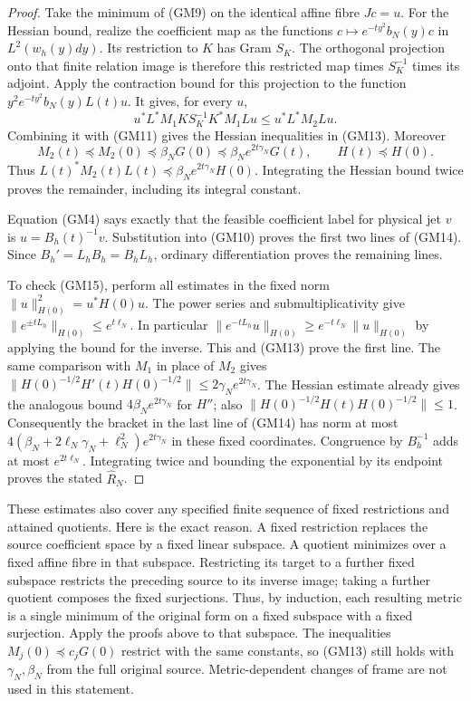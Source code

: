 \documentclass[11pt]{article}
\theoremstyle{remark}\newtheorem{remark}[theorem]{Remark}
\begin{document}
\begin{proof}
Take the minimum of (GM9) on the identical affine fibre $Jc=u$.
For the Hessian bound, realize the coefficient map as the functions
$c\mapsto e^{-ty^2}b_N(y)c$ in $L^2(w_h(y)dy)$.  Its restriction to
$K$ has Gram $S_K$.  The orthogonal projection onto that finite
relation image is therefore this restricted map times $S_K^{-1}$
times its adjoint.  Apply the contraction bound for this projection
to the function $y^2e^{-ty^2}b_N(y)L(t)u$.  It gives, for every $u$,
\[
 u^*L^*M_1K S_K^{-1}K^*M_1Lu\leq u^*L^*M_2Lu.
\]
Combining it with (GM11) gives the Hessian inequalities in (GM13).
Moreover
\[
 M_2(t)\preceq M_2(0)\preceq\beta_NG(0)
       \preceq\beta_Ne^{2t\gamma_N}G(t),
 \qquad H(t)\preceq H(0).
\]
Thus $L(t)^*M_2(t)L(t)\preceq
\beta_Ne^{2t\gamma_N}H(0)$.  Integrating the Hessian bound twice
proves the remainder, including its integral constant.

Equation (GM4) says exactly that the feasible coefficient label for
physical jet $v$ is $u=B_h(t)^{-1}v$.  Substitution into (GM10) proves
the first two lines of (GM14).  Since $B_h'=L_hB_h=B_hL_h$,
ordinary differentiation proves the remaining lines.

To check (GM15), perform all estimates in the fixed norm
$\|u\|_{H(0)}^2=u^*H(0)u$.  The power series and submultiplicativity
give $\|e^{\pm tL_h}\|_{H(0)}\leq e^{t\ell_N}$.  In particular
$\|e^{-tL_h}u\|_{H(0)}\geq e^{-t\ell_N}\|u\|_{H(0)}$ by applying
the bound for the inverse.  This and (GM13) prove the first line.
The same comparison with $M_1$ in place of $M_2$ gives
$\|H(0)^{-1/2}H'(t)H(0)^{-1/2}\|
\leq2\gamma_Ne^{2t\gamma_N}$.  The Hessian estimate already gives
the analogous bound $4\beta_Ne^{2t\gamma_N}$ for $H''$; also
$\|H(0)^{-1/2}H(t)H(0)^{-1/2}\|\leq1$.
Consequently the bracket in the last line of (GM14) has norm at most
$4(\beta_N+2\ell_N\gamma_N+\ell_N^2)e^{2t\gamma_N}$ in these fixed
coordinates.  Congruence by $B_h^{-1}$ adds at most $e^{2t\ell_N}$.
Integrating twice and bounding the exponential by its endpoint
proves the stated $\widehat R_N$.
\end{proof}

These estimates also cover any specified finite sequence of fixed
restrictions and attained quotients.  Here is the exact reason.
A fixed restriction replaces the source coefficient space by a fixed
linear subspace.  A quotient minimizes over a fixed affine fibre in
that subspace.  Restricting its target to a further fixed subspace
restricts the preceding source to its inverse image; taking a further
quotient composes the fixed surjections.  Thus, by induction, each
resulting metric is a single minimum of the original form on a fixed
subspace with a fixed surjection.  Apply the proofs above to that
subspace.  The inequalities $M_j(0)\preceq c_jG(0)$ restrict with the
same constants, so (GM13) still holds with $\gamma_N,\beta_N$ from
the full original source.  Metric-dependent changes of frame are
not used in this statement.
\end{document}

